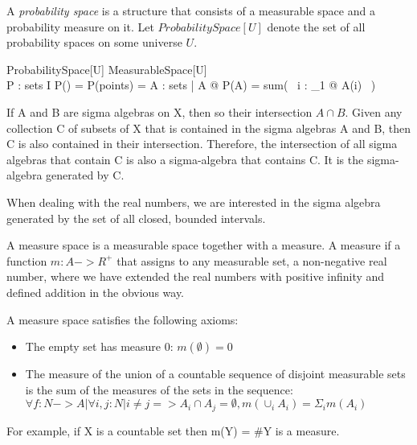 \documentclass{article}
\begin{document}
A {\it probability space} is a structure that consists of a measurable space and a probability measure on it.
Let $ProbabilitySpace[U]$ denote the set of all probability spaces on some universe $U$.
\begin{schema}{ProbabilitySpace}[U]
	MeasurableSpace[U] \\
	P : sets \fun I
\where
	P(\emptyset) = \realzero
\also
	P(points) = \realone
\also
	\forall A : \seq sets | \disjoint A @ P(\bigcup \ran A) = sum(~ \lambda i : \nat_1 @ A(i) ~)
\end{schema}


If A and B are sigma algebras on X, then so their intersection $A \cap B$.
Given any collection C of subsets of X that is contained in the sigma algebras A and B, then C is also contained in their intersection.
Therefore, the intersection of all sigma algebras that contain C is also a sigma-algebra that contains C. It is the sigma-algebra generated by C.

When dealing with the real numbers, we are interested in the sigma algebra generated by the set of all closed, bounded intervals. 

A measure space is a measurable space together with a measure. 
A measure if a function $m: A -> R^{+}$ that assigns to any measurable set, a non-negative real number, where we have extended the real numbers with positive infinity and defined addition in the obvious way.

A measure space satisfies the following axioms:

\begin{itemize}
\item The empty set has measure 0: $m(\emptyset) = 0$
\item The measure of the union of a countable sequence of disjoint measurable sets is the sum of the measures of the sets in the sequence: $\forall f: N -> A | \forall i, j : N | i \neq j => A_i \cap A_j = \emptyset, m(\cup_i A_i) = \Sigma_i m(A_i)$
\end{itemize}

For example, if X is a countable set then m(Y) = \#Y is a measure.






\end{document}
